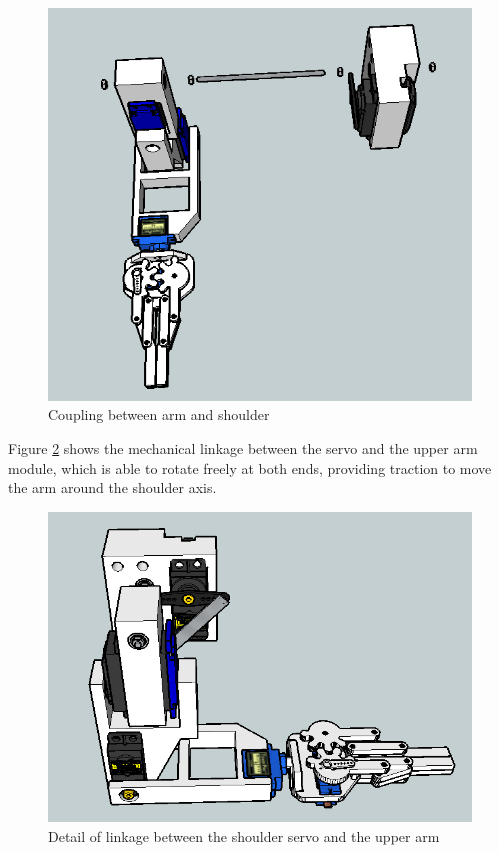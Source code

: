 	\begin{figure}[H]
			\centering
			\includegraphics[scale=0.5]{images/Assembly/17.png}
			\caption{Coupling between arm and shoulder }
			\label{ass17}
	\end{figure}
	\bigskip

Figure \ref{ass19} shows the mechanical linkage between the servo and the upper arm module, which is able to rotate freely at both ends, providing traction to move the arm around the shoulder axis.\\

	\begin{figure}[H]
			\centering
			\includegraphics[scale=0.5]{images/Assembly/19.png}
			\caption{Detail of linkage between the shoulder servo and the upper arm}
			\label{ass19}
	\end{figure}
	\bigskip

